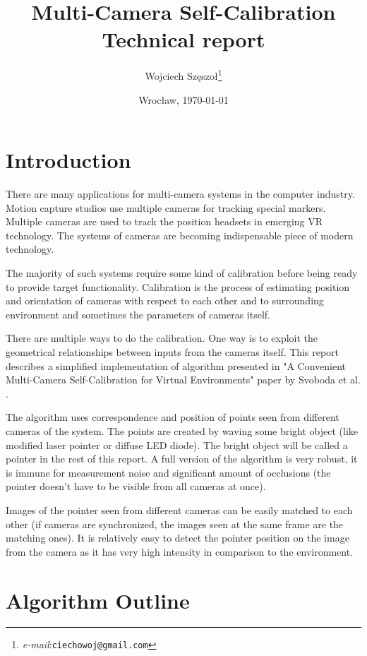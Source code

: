 \documentclass[12pt]{article}
\title{\textbf{Multi-Camera Self-Calibration}\\{\large Technical report}}
\author{Wojciech Szęszoł\thanks{\textit{e-mail}:\texttt{ciechowoj@gmail.com}}}
\date{Wrocław, \today}
\begin{document}
\maketitle

\thispagestyle{empty}
\newpage

\section{Introduction}

There are many applications for multi-camera systems in the computer industry. Motion capture studios use multiple cameras for tracking special markers. Multiple
cameras are used to track the position headsets in emerging VR technology. The systems of
cameras are becoming indispensable piece of modern technology.

The majority of such systems require some kind of calibration before being
ready to provide target functionality. Calibration is the process of
estimating position and orientation of cameras with respect to each other
and to surrounding environment and sometimes the parameters of cameras itself.

There are multiple ways to do the calibration. One way is to exploit the
geometrical relationships between inputs from the cameras itself. This report
describes a simplified implementation of algorithm presented in "A Convenient
Multi-Camera  Self-Calibration for Virtual Environments" paper by Svoboda et al.
\cite{svoboda05}.

The algorithm uses correspondence and position of points seen from different
cameras of the system. The points are created by waving some bright object
(like modified laser pointer or diffuse LED diode). The bright object will be
called a pointer in the rest of this report. A full version of the algorithm is
very robust, it is immune for measurement noise and significant amount of
occlusions (the pointer doesn't have to be visible from all cameras at once).

Images of the pointer seen from different cameras can be easily matched to each
other (if cameras are synchronized, the images seen at the same frame are the
matching ones). It is relatively easy to detect the pointer position on the
image from the camera as it has very high intensity in comparison to the
environment.

\section{Algorithm Outline}
\end{document}
